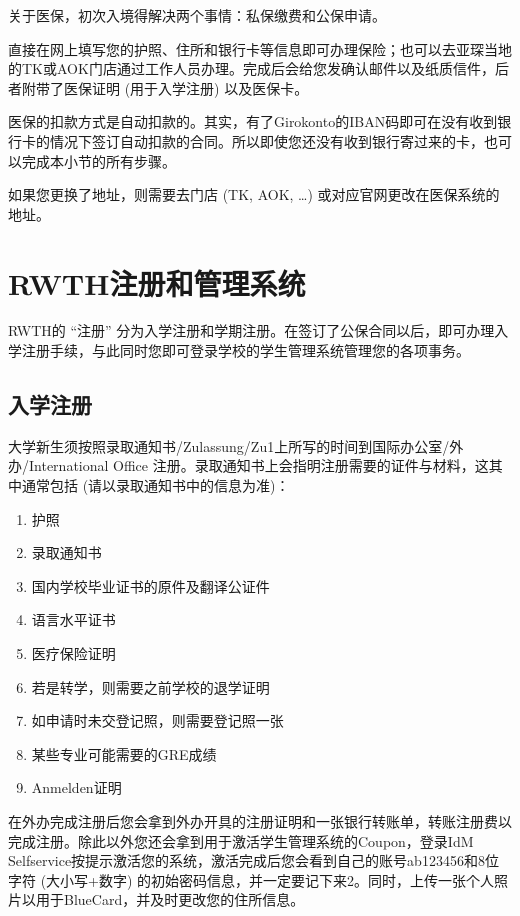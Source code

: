     关于医保，初次入境得解决两个事情：私保缴费和公保申请。

    直接在网上填写您的护照、住所和银行卡等信息即可办理保险；也可以去亚琛当地的TK或AOK门店通过工作人员办理。完成后会给您发确认邮件以及纸质信件，后者附带了医保证明 (用于入学注册) 以及医保卡。

    医保的扣款方式是自动扣款的。其实，有了Girokonto的IBAN码即可在没有收到银行卡的情况下签订自动扣款的合同。所以即使您还没有收到银行寄过来的卡，也可以完成本小节的所有步骤。

    如果您更换了地址，则需要去门店 (TK, AOK, …) 或对应官网更改在医保系统的地址。

\section{RWTH注册和管理系统}\label{sec:RWTH注册和管理系统}

  RWTH的 “注册” 分为入学注册和学期注册。在签订了公保合同以后，即可办理入学注册手续，与此同时您即可登录学校的学生管理系统管理您的各项事务。

  \subsection{入学注册}\label{subsec:入学注册}

    大学新生须按照录取通知书/Zulassung/Zu1上所写的时间到国际办公室/外办/International Office 注册。录取通知书上会指明注册需要的证件与材料，这其中通常包括 (请以录取通知书中的信息为准)：
    \begin{enumerate}
      \item 护照
      \item 录取通知书
      \item 国内学校毕业证书的原件及翻译公证件
      \item 语言水平证书
      \item 医疗保险证明
      \item 若是转学，则需要之前学校的退学证明
      \item 如申请时未交登记照，则需要登记照一张
      \item 某些专业可能需要的GRE成绩
      \item Anmelden证明
    \end{enumerate}
    
    在外办完成注册后您会拿到外办开具的注册证明和一张银行转账单，转账注册费以完成注册。除此以外您还会拿到用于激活学生管理系统的Coupon，登录IdM Selfservice按提示激活您的系统，激活完成后您会看到自己的账号ab123456和8位字符 (大小写+数字) 的初始密码信息，并一定要记下来2。同时，上传一张个人照片以用于BlueCard，并及时更改您的住所信息。

